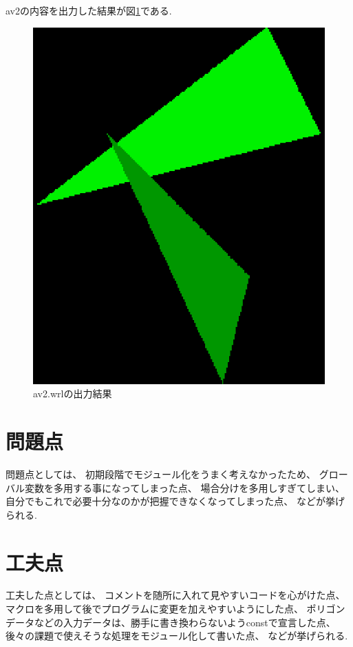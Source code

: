 \documentclass[a4j,dvipdfmx]{jsarticle}
\begin{document}
av2の内容を出力した結果が図\ref{fig:av2}である.
\begin{figure}[htbp]
  \begin{center}
        \includegraphics[clip,scale=0.7]{images/av2.eps}
        \caption{av2.wrlの出力結果}
        \label{fig:av2}
  \end{center}
\end{figure}



\section{問題点}
問題点としては、
初期段階でモジュール化をうまく考えなかったため、
グローバル変数を多用する事になってしまった点、
場合分けを多用しすぎてしまい、自分でもこれで必要十分なのかが把握できなくなってしまった点、
などが挙げられる.

\section{工夫点}
工夫した点としては、
コメントを随所に入れて見やすいコードを心がけた点、
マクロを多用して後でプログラムに変更を加えやすいようにした点、
ポリゴンデータなどの入力データは、勝手に書き換わらないようconstで宣言した点、
後々の課題で使えそうな処理をモジュール化して書いた点、
などが挙げられる.
\end{document}
